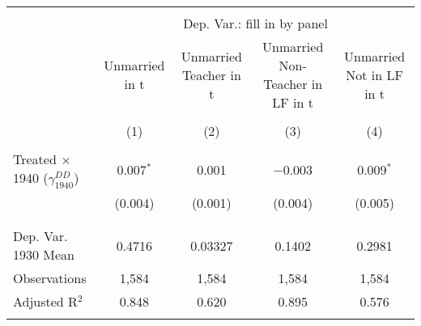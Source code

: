 
\begin{tabular}{@{\extracolsep{5pt}}lcccc} 
\\[-1.8ex]\hline 
\hline \\[-1.8ex] 
 & \multicolumn{4}{c}{Dep. Var.: fill in by panel} \\ 
\cline{2-5} 
 & Unmarried in t & Unmarried Teacher in t & Unmarried Non-Teacher in LF in t & Unmarried Not in LF in t \\ 
\\[-1.8ex] & (1) & (2) & (3) & (4)\\ 
\hline \\[-1.8ex] 
 Treated $\times$ 1940 ($\gamma_{1940}^{DD}$) & 0.007$^{*}$ & 0.001 & $-$0.003 & 0.009$^{*}$ \\ 
  & (0.004) & (0.001) & (0.004) & (0.005) \\ 
  & & & & \\ 
\hline \\[-1.8ex] 
Dep. Var. 1930 Mean & 0.4716 & 0.03327 & 0.1402 & 0.2981 \\ 
Observations & 1,584 & 1,584 & 1,584 & 1,584 \\ 
Adjusted R$^{2}$ & 0.848 & 0.620 & 0.895 & 0.576 \\ 
\hline 
\hline \\[-1.8ex] 
\end{tabular} 
